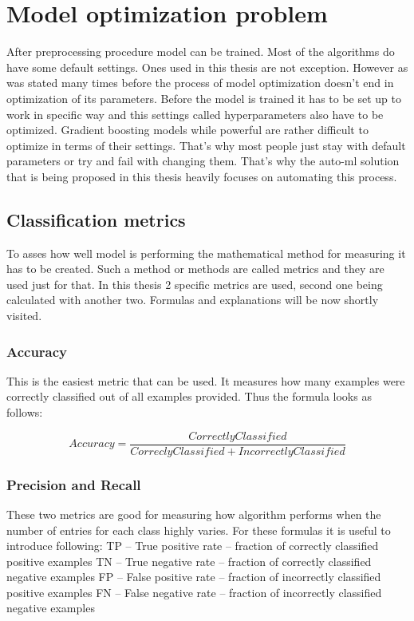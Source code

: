 \documentclass[a4paper,twoside,12pt]{book}
\begin{document}
\section{Model optimization problem}

After preprocessing procedure model can be trained. Most of the algorithms do have some default settings. Ones used in this thesis are not exception. However as was stated many times before the process of model optimization doesn't end in optimization of its parameters. Before the model is trained it has to be set up to work in specific way and this settings called hyperparameters also have to be optimized. Gradient boosting models while powerful are rather difficult to optimize in terms of their settings. That's why most people just stay with default parameters or try and fail with changing them.
That's why the auto-ml solution that is being proposed in this thesis heavily focuses on automating this process.

\subsection{Classification metrics}
To asses how well model is performing the mathematical method for measuring it has to be created.
Such a method or methods are called metrics and they are used just for that.
In this thesis 2 specific metrics are used, second one being calculated with another two. Formulas and explanations will be now shortly visited.

\subsubsection{Accuracy}
This is the easiest metric that can be used. It measures how many examples were correctly classified out of all examples provided.
Thus the formula looks as follows:

\begin{equation}
Accuracy = \frac{Correctly Classified}{Correcly Classified + IncorrectlyClassified}
\end{equation}


\subsubsection{Precision and Recall}

These two metrics are good for measuring how algorithm performs when the number of entries for each class highly varies. For these formulas it is useful to introduce following:
\newline
\newline
TP -- True positive rate -- fraction of correctly classified positive examples
\newline
TN -- True negative rate -- fraction of correctly classified negative examples
\newline
FP -- False positive rate -- fraction of incorrectly classified positive examples
\newline
FN -- False negative rate -- fraction of incorrectly classified negative examples
\newline
\newline
\end{document}
